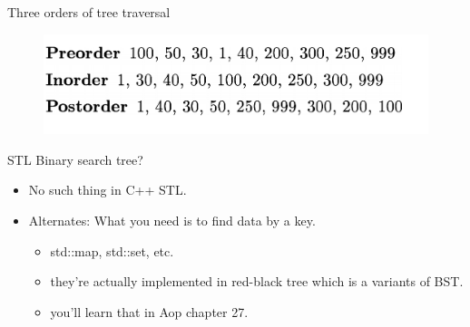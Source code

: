 \documentclass[aspectratio=169]{beamer}
\begin{document}
\begin{frame}{Three orders of tree traversal}
        \begin{figure}
            \includegraphics[width=\textwidth]{BST_order.png}
    \end{figure}
\end{frame}

\begin{frame}{STL Binary search tree?}

\begin{itemize}
    \item No such thing in C++ STL.
    \item Alternates: What you need is to find  data by a key.
        \begin{itemize}
            \item std::map, std::set, etc.
            \item they're actually implemented in red-black tree which is a variants of BST.
            \item you'll learn that in Aop chapter 27.
        \end{itemize}
\end{itemize}
    
\end{frame}
\end{document}
